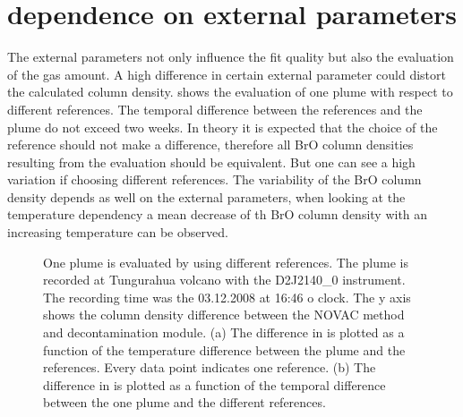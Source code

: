 \documentclass  [
  paper    = a4,
  BCOR     = 10mm,
  twoside,
  fontsize = 12pt,
  fleqn,
  toc      = bibnumbered,
  toc      = listofnumbered,
  numbers  = noendperiod,
  headings = normal,
  listof   = leveldown,
  version  = 3.03
]                                       {scrreprt}
\begin{document}
	\section{  dependence on external parameters\label{Chap:BrOdep}}
	The external parameters not only influence the fit quality but also the evaluation of the gas amount. A high difference in certain external parameter could distort the calculated   column density.  shows the evaluation of one plume with respect to different references. The temporal difference between the references and the plume do not exceed two weeks. In theory it is expected that the choice of  the reference should not make a difference, therefore all BrO column densities resulting from the evaluation should be equivalent. But one can see a high variation if choosing different references. The variability of the BrO column density depends as well on the external parameters, when looking at the temperature dependency a mean decrease of th BrO column density with an increasing temperature can be observed.
		\begin{figure}
		\caption[One plume is evaluated by using different references.  The y axis shows the  SCD difference between the NOVAC routine and decontamination module. (a) The difference in   as a function of the temperature difference. (b) The difference in  as a function of the temporal difference between the one plume and the different references.]{One plume is evaluated by using different references. The plume is recorded at Tungurahua volcano with the D2J2140\_0 instrument. The recording time was the  03.12.2008  at 16:46 o clock. The y axis shows the   column density difference between the NOVAC method and decontamination module. (a) The difference in   is plotted as a function of the temperature difference between the plume and the references. Every data point indicates one reference. (b) The difference in   is plotted as a function of the temporal difference between the one plume and the different references.}
		\label{fig:d2j2140060218difftemperature-cbro}		
	\end{figure}
\end{document}
